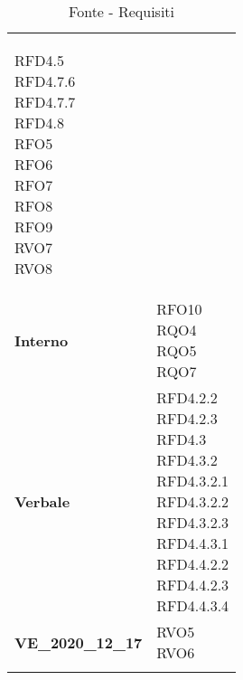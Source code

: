 \begin{longtable}[H]{| >{\centering\bfseries}p{8cm} | >{\centering\arraybackslash}p{8cm} |}
{            RFD4.5 \\
            RFD4.7.6 \\
            RFD4.7.7 \\
            RFD4.8 \\
            RFO5 \\
            RFO6 \\
            RFO7 \\
            RFO8 \\
            RFO9 \\
            RVO7 \\
            RVO8 \\
            \rule{0pt}{2ex}
        } \\

    \rowcolor{white}
    Interno &
    \makecell{
        \rule{0pt}{4ex}
        RFO10 \\
        RQO4 \\
        RQO5 \\
        RQO7 \\
        \rule{0pt}{2ex}
    } \\

    \rowcolor{white!80!lightgray!90}
    Verbale &
        \makecell{
            \rule{0pt}{4ex}
            RFD4.2.2 \\
            RFD4.2.3 \\
            RFD4.3 \\
            RFD4.3.2\\
            RFD4.3.2.1 \\
            RFD4.3.2.2 \\
            RFD4.3.2.3 \\
            RFD4.4.3.1 \\
            RFD4.4.2.2 \\
            RFD4.4.2.3 \\
            RFD4.4.3.4 \\
            \rule{0pt}{2ex}
        } \\
		
	\rowcolor{white}
    VE\_2020\_12\_17 &
    \makecell{
        \rule{0pt}{4ex}
		RVO5 \\
        RVO6 \\
        \rule{0pt}{2ex}
    } \\

    \hline
    \rowcolor{white}
    \caption{Fonte - Requisiti}
    \label{tab:fonte_requisiti}
\end{longtable}


